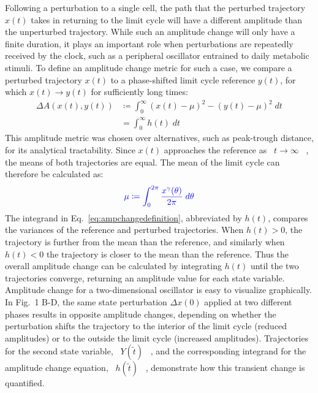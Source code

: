 \documentclass[11pt, letterpaper]{article}
\providecommand{\DIFadd}[1]{{\protect\color{blue}#1}} %
\providecommand{\DIFaddbegin}{} %
\providecommand{\DIFaddend}{} %
\begin{document}
\DIFadd{Following a perturbation to a single cell, the path that }\DIFaddend the perturbed trajectory $x(t)$ takes in returning to the limit cycle will have a different amplitude than the unperturbed trajectory.
While such an amplitude change will only have a finite duration, it plays an important role when perturbations are repeatedly received by the clock, such as a peripheral oscillator entrained to daily metabolic stimuli.
To define an amplitude change metric for such a case, we compare a perturbed trajectory $x(t)$ to a phase-shifted \DIFaddbegin \DIFadd{limit cycle reference }\DIFaddend $y(t)$, for which $x(t) \to y(t)$ for sufficiently long times:
\begin{equation}
  \begin{aligned}
    \Delta A (x(t), y(t)) &\coloneqq \int_0^\infty (x(t) - \mu)^2 - (y(t) - \mu)^2 \; dt\\
    &= \int_0^\infty h(t) \; dt
  \end{aligned}
  \label{eq:ampchangedefinition}
\end{equation}
\DIFaddbegin \DIFadd{This amplitude metric was chosen over alternatives, such as peak-trough distance, for its analytical tractability.
Since }\DIFaddend $x(t)$ \DIFaddbegin \DIFadd{approaches the reference as \mbox{%
$t \to \infty$
}%
, the means of both trajectories are equal.
The mean of the limit cycle can therefore be calculated as:
}\begin{equation}\DIFadd{
  \mu \coloneqq \int_0^{2\pi} \frac{x^\gamma(\theta)}{2\pi} \; d\theta
  \label{eq:mu}
}\end{equation}
\DIFaddend The integrand in Eq.\DIFaddbegin \DIFadd{~}\DIFaddend \ref{eq:ampchangedefinition}, abbreviated by $h(t)$, compares the variances of the reference and perturbed trajectories.
When $h(t) > 0$, the trajectory is further from the mean than the reference, and similarly when $h(t) < 0$ the trajectory is closer to the mean than the reference.
Thus the overall amplitude change can be calculated by integrating $h(t)$ until the two trajectories converge, returning an amplitude value for each state variable.
Amplitude change for a two-dimensional oscillator is easy to visualize graphically.
In Fig.\DIFaddbegin \DIFadd{~}\DIFaddend 1 B-D, the same state perturbation $\Delta x(0)$ applied at two different phases results in opposite amplitude changes, depending on whether the perturbation shifts the trajectory to the interior of the limit cycle (reduced amplitudes) or to the outside the limit cycle (increased amplitudes).
Trajectories for the second state variable, \DIFaddbegin \DIFadd{\mbox{%
$Y(\tilde{t})$
}%
}\DIFaddend , and the corresponding integrand for the amplitude change equation, \DIFaddbegin \DIFadd{\mbox{%
$h(\tilde{t})$
}%
}\DIFaddend , demonstrate how this transient change is quantified.
\end{document}
